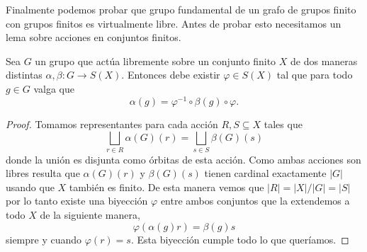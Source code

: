 \documentclass[tesis.tex]{subfiles}
\begin{document}
Finalmente podemos probar que grupo fundamental de un grafo de grupos finito con grupos finitos es virtualmente libre. 
Antes de probar esto necesitamos un lema sobre acciones en conjuntos finitos.

\begin{lema}\label{lema_acciones_finitas}
	Sea $G$ un grupo que actúa libremente sobre un conjunto finito $X$ de dos maneras distintas $\alpha, \beta : G \to S(X)$. 
	Entonces debe existir $\varphi \in S(X)$ tal que para todo $g \in G$ valga que 
	\[
	\alpha (g) = \varphi^{-1} \circ \beta(g) \circ \varphi.
	\]
\end{lema}
\begin{proof}
	Tomamos representantes para cada acción $R,S \subseteq X$ tales que
	\[
		\bigsqcup_{r \in R} \alpha(G) (r) = \bigsqcup_{s \in S} \beta(G) (s)
	\]
	donde la unión es disjunta como órbitas de esta acción. 
	Como ambas acciones son libres resulta que $\alpha(G)(r)$ y $\beta(G)(s)$ tienen cardinal exactamente $|G|$ usando que $X$ también es finito.
	De esta manera vemos que $|R| = |X| / |G| = |S|$ por lo tanto existe una biyección $\varphi$ entre ambos conjuntos que la extendemos a todo $X$ de la siguiente manera,
	\[
		\varphi (\alpha(g) r) = \beta(g)  s
	\]
	siempre y cuando $\varphi(r) = s$. 
	Esta biyección cumple todo lo que queríamos.
\end{proof}
\end{document}
